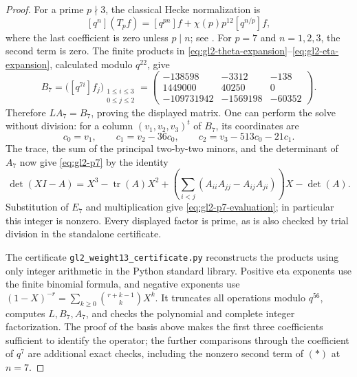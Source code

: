 \begin{proof}
For a prime $p\nmid3$, the classical Hecke normalization is
\[
 [q^n](T_pf)=[q^{pn}]f+\chi(p)p^{12}[q^{n/p}]f,
 \tag{*}
\]
where the last coefficient is zero unless $p\mid n$;
see \cite[\S8.2.2, p.~66]{K17RibetStein2011}.
For $p=7$ and $n=1,2,3$, the second term is zero.
The finite products in \eqref{eq:gl2-theta-expansion}--\eqref{eq:gl2-eta-expansion},
calculated modulo $q^{22}$, give
\[
 B_7=\bigl([q^{7i}]f_j\bigr)_{\substack{1\le i\le3\\0\le j\le2}}
 =\begin{pmatrix}
 -138598&-3312&-138\\
 1449000&40250&0\\
 -109731942&-1569198&-60352
 \end{pmatrix}.
\]
Therefore $LA_7=B_7$, proving the displayed matrix.
One can perform the solve without division: for a column $(v_1,v_2,v_3)^t$
of $B_7$, its coordinates are
\[
 c_0=v_1,\qquad c_1=v_2-36c_0,\qquad
 c_2=v_3-513c_0-21c_1.
\]
The trace, the sum of the principal two-by-two minors, and the determinant
of $A_7$ now give \eqref{eq:gl2-p7} by the identity
\[
 \det(XI-A)=X^3-\operatorname{tr}(A)X^2+
 \left(\sum_{i<j}(A_{ii}A_{jj}-A_{ij}A_{ji})\right)X-\det(A).
\]
Substitution of $E_7$ and multiplication give
\eqref{eq:gl2-p7-evaluation}; in particular this integer is nonzero.
Every displayed factor is prime, as is also checked by trial division in
the standalone certificate.

The certificate
\texttt{gl2\_weight13\_certificate.py} reconstructs the products using only
integer arithmetic in the Python standard library. Positive eta exponents
use the finite binomial formula, and negative exponents use
$(1-X)^{-r}=\sum_{k\ge0}\binom{r+k-1}{k}X^k$.
It truncates all operations modulo $q^{56}$, computes $L,B_7,A_7$,
and checks the polynomial and complete integer factorization.
The proof of the basis above makes the first three coefficients
sufficient to identify the operator; the further comparisons through
the coefficient of $q^7$ are additional exact checks, including the
nonzero second term of $(*)$ at $n=7$.
\end{proof}

